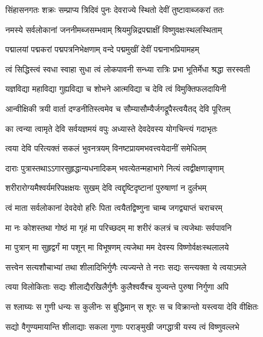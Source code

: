 

\twolineshloka
{सिंहासनगतः शक्रः सम्प्राप्य त्रिदिवं पुनः}
{देवराज्ये स्थितो देवीं तुष्टावाब्जकरां ततः}

\twolineshloka
{नमस्ये सर्वलोकानां जननीमब्जसम्भवाम्}
{श्रियमुन्निद्रपद्माक्षीं विष्णुवक्षःस्थलस्थिताम्}

\twolineshloka
{पद्मालयां पद्मकरां पद्मपत्रनिभेक्षणाम्}
{वन्दे पद्ममुखीं देवीं पद्मनाभप्रियामहम्}

\twolineshloka
{त्वं सिद्धिस्त्वं स्वधा स्वाहा सुधा त्वं लोकपावनी}
{सन्ध्या रात्रिः प्रभा भूतिर्मेधा श्रद्धा सरस्वती}

\twolineshloka
{यज्ञविद्या महाविद्या गुह्यविद्या च शोभने}
{आत्मविद्या च देवि त्वं विमुक्तिफलदायिनी}

\twolineshloka
{आन्वीक्षिकी त्रयी वार्ता दण्डनीतिस्त्वमेव च}
{सौम्यासौम्यैर्जगद्रूपैस्त्वयैतद् देवि पूरितम्}

\twolineshloka
{का त्वन्या त्वामृते देवि सर्वयज्ञमयं वपुः}
{अध्यास्ते देवदेवस्य योगचिन्त्यं गदाभृतः}

\twolineshloka
{त्वया देवि परित्यक्तं सकलं भुवनत्रयम्}
{विनष्टप्रायमभवत्त्वयेदानीं समेधितम्}

\twolineshloka
{दाराः पुत्रास्तथाऽऽगारसुहृद्धान्यधनादिकम्}
{भवत्येतन्महाभागे नित्यं त्वद्वीक्षणान्नृणाम्}

\twolineshloka
{शरीरारोग्यमैश्वर्यमरिपक्षक्षयः सुखम्}
{देवि त्वद्दृष्टिदृष्टानां पुरुषाणां न दुर्लभम्}

\twolineshloka
{त्वं माता सर्वलोकानां देवदेवो हरिः पिता}
{त्वयैतद्विष्णुना चाम्ब जगद्व्याप्तं चराचरम्}

\twolineshloka
{मा नः कोशस्तथा गोष्ठं मा गृहं मा परिच्छदम्}
{मा शरीरं कलत्रं च त्यजेथाः सर्वपावनि}

\twolineshloka
{मा पुत्रान् मा सुहृद्वर्गं मा पशून् मा विभूषणम्}
{त्यजेथा मम देवस्य विष्णोर्वक्षःस्थलालये}

\twolineshloka
{सत्त्वेन सत्यशौचाभ्यां तथा शीलादिभिर्गुणैः}
{त्यज्यन्ते ते नराः सद्यः सन्त्यक्ता ये त्वयाऽमले}

\twolineshloka
{त्वया विलोकिताः सद्यः शीलाद्यैरखिलैर्गुणैः}
{कुलैश्वर्यैश्च युज्यन्ते पुरुषा निर्गुणा अपि}

\twolineshloka
{स श्लाघ्यः स गुणी धन्यः स कुलीनः स बुद्धिमान्}
{स शूरः स च विक्रान्तो यस्त्वया देवि वीक्षितः}

\twolineshloka
{सद्यो वैगुण्यमायान्ति शीलाद्याः सकला गुणाः}
{पराङ्मुखी जगद्धात्री यस्य त्वं विष्णुवल्लभे}

